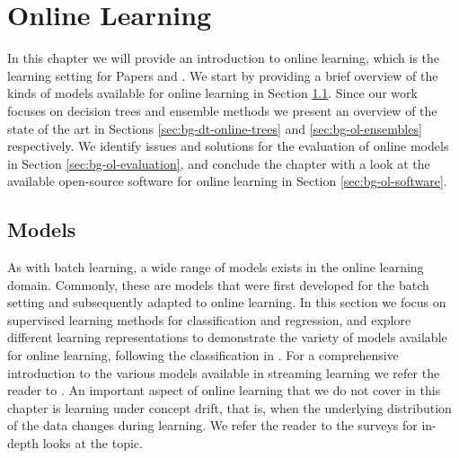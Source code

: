 \chapter{Online Learning}
\label{ch:bg-online-learning}

In this chapter we will provide an introduction to online learning, which is the learning
setting for Papers \uncertaintreesNum and \boostvhtNum. We start by providing a brief
overview of the kinds of models available for online learning in Section \ref{sec:bg-ol-models}.
Since our work focuses on decision trees and ensemble methods we present an overview of
the state of the art in Sections \ref{sec:bg-dt-online-trees} and \ref{sec:bg-ol-ensembles} respectively.
We identify issues and solutions for the evaluation of online models in Section \ref{sec:bg-ol-evaluation}, and conclude the chapter with a look at the available
open-source software for online learning in Section \ref{sec:bg-ol-software}.

\section{Models}
\label{sec:bg-ol-models}

As with batch learning, a wide range of models exists in the online
learning domain. Commonly, these are models that were first developed
for the batch setting and subsequently adapted to online learning.
In this section we focus on supervised learning methods for
classification and regression, and explore different
learning representations to demonstrate the variety of
models available for online learning, following the
classification in \cite{onlineML}. For a comprehensive
introduction to the various models available in streaming
learning we refer the reader to \cite{moa-book}.
An important aspect of online learning that we do not cover in this chapter is learning
under concept drift, that is, when the underlying distribution
of the data changes during learning. We refer the reader
to the surveys \cite{concept-drift-survey-indre, concept-drift-survey-gama}
for in-depth looks at the topic.


